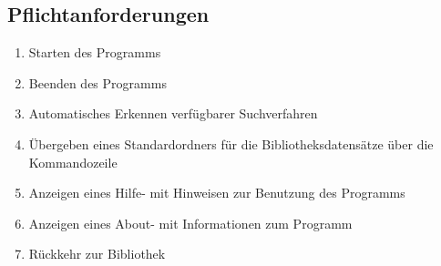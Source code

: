 \subsection{Pflichtanforderungen}
\begin{enumerate} [label=\bfseries /F \arabic*0/, leftmargin=*]
	\item Starten des Programms \label{f:programmstart}
	\item Beenden des Programms \label{f:beenden}
	\item Automatisches Erkennen verfügbarer \gls{Suchverfahren} \label{f:erkennen_suchverfahren}
	\item Übergeben eines Standardordners für die Bibliotheksdatensätze über die Kommandozeile \label{f:standardordner_übergeben}
	\item Anzeigen eines Hilfe- mit Hinweisen zur Benutzung des Programms \label{f:hilfe}
	\item Anzeigen eines About- mit Informationen zum Programm \label{f:about}
	\item Rückkehr zur Bibliothek \label{f:rückkehr_zu_bibliothek}
	\newline
 

\end{enumerate}
